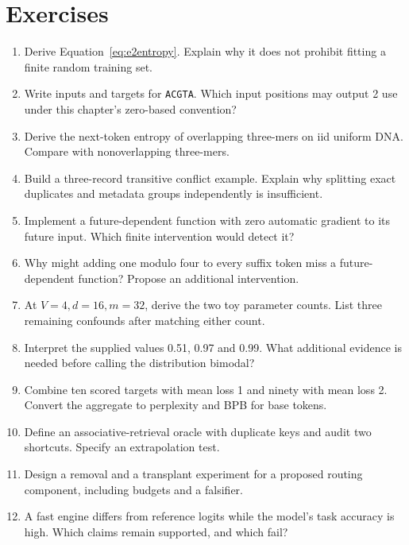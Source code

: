 \section{Exercises}
\begin{enumerate}
\item Derive Equation~\ref{eq:e2entropy}. Explain why it does not prohibit fitting a finite random training set.
\item Write inputs and targets for \texttt{ACGTA}. Which input positions may output 2 use under this chapter's zero-based convention?
\item Derive the next-token entropy of overlapping three-mers on iid uniform DNA. Compare with nonoverlapping three-mers.
\item Build a three-record transitive conflict example. Explain why splitting exact duplicates and metadata groups independently is insufficient.
\item Implement a future-dependent function with zero automatic gradient to its future input. Which finite intervention would detect it?
\item Why might adding one modulo four to every suffix token miss a future-dependent function? Propose an additional intervention.
\item At $V=4,d=16,m=32$, derive the two toy parameter counts. List three remaining confounds after matching either count.
\item Interpret the supplied values 0.51, 0.97 and 0.99. What additional evidence is needed before calling the distribution bimodal?
\item Combine ten scored targets with mean loss 1 and ninety with mean loss 2. Convert the aggregate to perplexity and BPB for base tokens.
\item Define an associative-retrieval oracle with duplicate keys and audit two shortcuts. Specify an extrapolation test.
\item Design a removal and a transplant experiment for a proposed routing component, including budgets and a falsifier.
\item A fast engine differs from reference logits while the model's task accuracy is high. Which claims remain supported, and which fail?
\end{enumerate}

